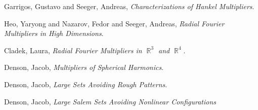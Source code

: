 \documentclass[12pt]{article}
\DeclareMathOperator{\RR}{\mathbb{R}}
\begin{document}
\begin{thebibliography}{03}

 Garrigos, Gustavo and Seeger, Andreas,
	\emph{Characterizations of {H}ankel Multipliers}.

 Heo, Yaryong and Nazarov, Fedor and Seeger, Andreas,
	\emph{Radial {F}ourier Multipliers in High Dimensions}.

 Cladek, Laura,
	\emph{Radial {F}ourier Multipliers in $\RR^3$ and $\RR^4$}.

 Denson, Jacob,
	\emph{Multipliers of Spherical Harmonics}.

 Denson, Jacob,
 	\emph{Large Sets Avoiding Rough Patterns}.

 Denson, Jacob,
	\emph{Large Salem Sets Avoiding Nonlinear Configurations}

\end{thebibliography}
\end{document}
